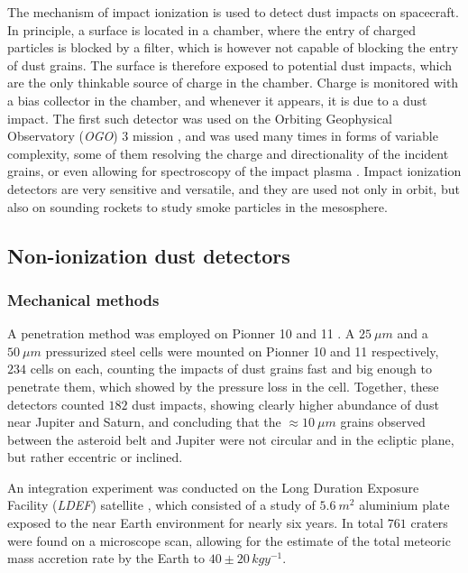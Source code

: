 The mechanism of impact ionization is used to detect dust impacts on spacecraft. In principle, a surface is located in a chamber, where the entry of charged particles is blocked by a filter, which is however not capable of blocking the entry of dust grains.  The surface is therefore exposed to potential dust impacts, which are the only thinkable source of charge in the chamber. Charge is monitored with a bias collector in the chamber, and whenever it appears, it is due to a dust impact. The first such detector was used on the Orbiting Geophysical Observatory (\textit{OGO}) 3 mission \citep{alexander1968zodiacal}, and was used many times in forms of variable complexity, some of them resolving the charge and directionality \citep{grun1992galileo,grun1992ulysses,berg1969pioneer} of the incident grains, or even allowing for spectroscopy of the impact plasma \citep{srama2004cassini,sommer2023measuring}. Impact ionization detectors are very sensitive and versatile, and they are used not only in orbit, but also on sounding rockets \citep{gunnarsdottir2019charging,trollvik2019observation} to study smoke particles in the mesosphere. 

\subsection{Non-ionization dust detectors}

\subsubsection{Mechanical methods} 

A penetration method was employed on Pionner 10 and 11 \citep{humes1980results}. A $\SI{25}{\mu m}$ and a $\SI{50}{\mu m}$ pressurized steel cells were mounted on Pionner 10 and 11 respectively, $234$ cells on each, counting the impacts of dust grains fast and big enough to penetrate them, which showed by the pressure loss in the cell. Together, these detectors counted $182$ dust impacts, showing clearly higher abundance of dust near Jupiter and Saturn, and concluding that the $\approx \SI{10}{\mu m}$ grains observed between the asteroid belt and Jupiter were not circular and in the ecliptic plane, but rather eccentric or inclined. 

An integration experiment was conducted on the Long Duration Exposure Facility (\textit{LDEF}) satellite \citep{love1993direct}, which consisted of a study of $\SI{5.6}{m^2}$ aluminium plate exposed to the near Earth environment for nearly six years. In total $761$ craters were found on a microscope scan, allowing for the estimate of the total meteoric mass accretion rate by the Earth to $40 \pm 20 \, \si{kg y^{-1}}$. 

